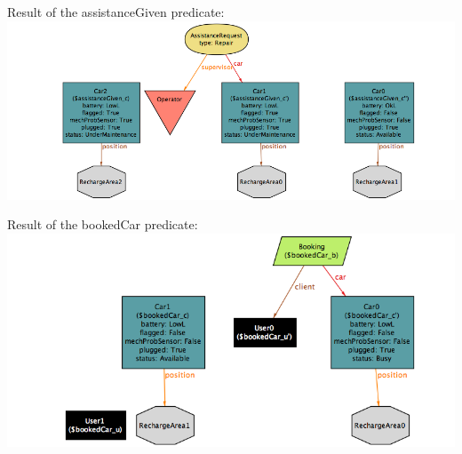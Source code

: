 \documentclass[]{article}
\begin{document}
Result of the assistanceGiven predicate:\newline
\includegraphics[width=1.00000\textwidth,height=1.00000\textwidth]{./alloyworlds/assistanceGiven.png}

\newpage

Result of the bookedCar predicate:\newline \newline
\includegraphics[width=1.00000\textwidth,height=1.00000\textwidth]{./alloyworlds/bookedCar.png}
\end{document}
